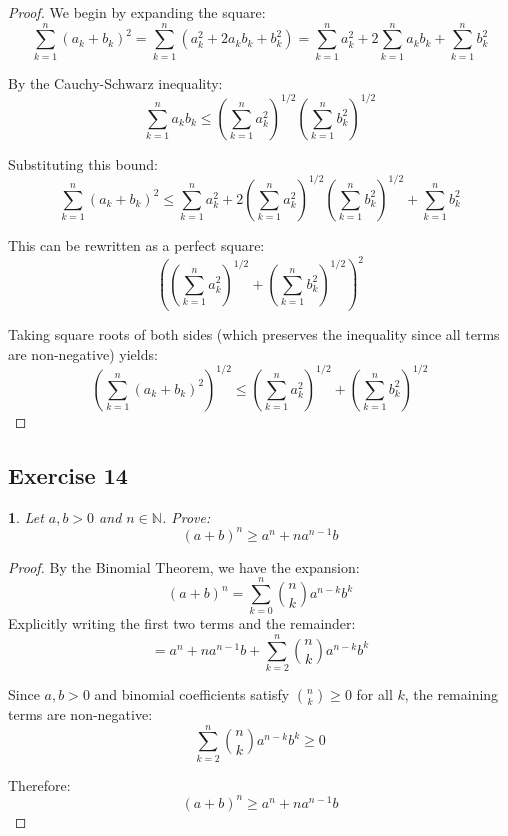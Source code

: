 \documentclass[12pt]{article}
\newtheorem{problem}{}
\begin{document}
\begin{proof}
We begin by expanding the square:
\[
\sum_{k=1}^n (a_k + b_k)^2 = \sum_{k=1}^n (a_k^2 + 2a_k b_k + b_k^2) = \sum_{k=1}^n a_k^2 + 2\sum_{k=1}^n a_k b_k + \sum_{k=1}^n b_k^2
\]

By the Cauchy-Schwarz inequality:
\[
\sum_{k=1}^n a_k b_k \leq \left( \sum_{k=1}^n a_k^2 \right)^{1/2} \left( \sum_{k=1}^n b_k^2 \right)^{1/2}
\]

Substituting this bound:
\[
\sum_{k=1}^n (a_k + b_k)^2 \leq \sum_{k=1}^n a_k^2 + 2\left( \sum_{k=1}^n a_k^2 \right)^{1/2}\left( \sum_{k=1}^n b_k^2 \right)^{1/2} + \sum_{k=1}^n b_k^2
\]

This can be rewritten as a perfect square:
\[
\left( \left( \sum_{k=1}^n a_k^2 \right)^{1/2} + \left( \sum_{k=1}^n b_k^2 \right)^{1/2} \right)^2
\]

Taking square roots of both sides (which preserves the inequality since all terms are non-negative) yields:
\[
\left( \sum_{k=1}^n (a_k + b_k)^2 \right)^{1/2} \leq \left( \sum_{k=1}^n a_k^2 \right)^{1/2} + \left( \sum_{k=1}^n b_k^2 \right)^{1/2}
\]
\end{proof}

\subsection*{Exercise 14}
\begin{problem}
Let \( a, b > 0 \) and \( n \in \mathbb{N} \). Prove:
\[
(a + b)^n \geq a^n + n a^{n-1} b
\]
\end{problem}

\begin{proof}
By the Binomial Theorem, we have the expansion:
\[
(a + b)^n = \sum_{k=0}^n \binom{n}{k} a^{n-k} b^k
\]
Explicitly writing the first two terms and the remainder:
\[
= a^n + n a^{n-1} b + \sum_{k=2}^n \binom{n}{k} a^{n-k} b^k
\]

Since \( a, b > 0 \) and binomial coefficients satisfy \( \binom{n}{k} \geq 0 \) for all \( k \), the remaining terms are non-negative:
\[
\sum_{k=2}^n \binom{n}{k} a^{n-k} b^k \geq 0
\]

Therefore:
\[
(a + b)^n \geq a^n + n a^{n-1} b
\]
\end{proof}
\end{document}
